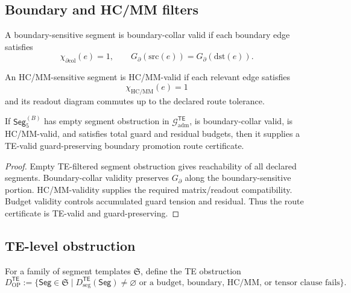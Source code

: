 \subsection{Boundary and HC/MM filters}
\label{subsec:v410r16-boundary-hcmm-filters}

\begin{definition}
\label{def:v410r16-boundary-collar-filter}
A boundary-sensitive segment is boundary-collar valid if each boundary edge
satisfies
\[
 \chi_{\partial\mathrm{col}}(e)=1,
 \qquad
 G_{\partial}(\mathrm{src}(e))=G_{\partial}(\mathrm{dst}(e)).
\]
\end{definition}

\begin{definition}
\label{def:v410r16-hcmm-compatibility-filter}
An HC/MM-sensitive segment is HC/MM-valid if each relevant edge satisfies
\[
 \chi_{\mathrm{HC/MM}}(e)=1
\]
and its readout diagram commutes up to the declared route tolerance.
\end{definition}

\begin{proposition}
\label{prop:v410r16-op5b-te-boundary-criterion}
If \(\mathsf{Seg}_{5}^{(B)}\) has empty segment obstruction in
\(\mathcal G_{\mathrm{adm}}^{\mathsf{TE}}\), is boundary-collar valid, is
HC/MM-valid, and satisfies total guard and residual budgets, then it supplies a
TE-valid guard-preserving boundary promotion route certificate.
\end{proposition}

\begin{proof}
Empty TE-filtered segment obstruction gives reachability of all declared
segments. Boundary-collar validity preserves \(G_{\partial}\) along the
boundary-sensitive portion. HC/MM-validity supplies the required matrix/readout
compatibility. Budget validity controls accumulated guard tension and residual.
Thus the route certificate is TE-valid and guard-preserving.
\end{proof}

\subsection{TE-level obstruction}
\label{subsec:v410r16-te-level-obstruction}

\begin{definition}[TE obstruction]
\label{def:v410r16-te-obstruction}
For a family of segment templates \(\mathfrak S\), define the TE obstruction
\[
 D_{\mathrm{OP}}^{\mathsf{TE}}
 :=
 \{\mathsf{Seg}\in\mathfrak S\mid
 D_{\mathrm{seg}}^{\mathsf{TE}}(\mathsf{Seg})\neq\varnothing
 \text{ or a budget, boundary, HC/MM, or tensor clause fails}\}.
\]
\end{definition}

